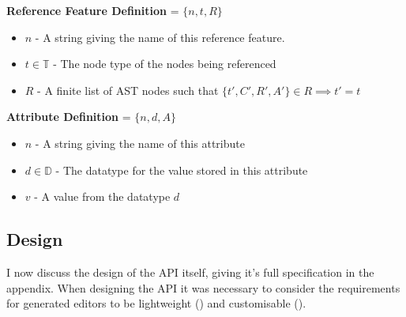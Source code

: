 \documentclass{article}
\begin{document}
%
\textbf{Reference Feature Definition} = $\{n,t,R\}$ 
\begin{itemize}
\item $n$ - A string giving the name of this reference feature.
\item $t\in \mathbb{T}$ - The node type of the nodes being referenced 
\item $R$ - A finite list of AST nodes such that $\{t',C',R',A'\} \in R \implies t'=t$
\end{itemize}
%
\textbf{Attribute Definition} = $\{n,d,A\}$ 
\begin{itemize}
\item $n$ - A string giving the name of this attribute
\item $d\in \mathbb{D}$ - The datatype for the value stored in this attribute
\item $v$ - A value from the datatype $d$
\end{itemize}
%
\subsection{Design}\label{apiDesign}
I now discuss the design of the API itself, giving it's full specification in the appendix. When designing the API it was necessary to consider the requirements for generated editors to be lightweight (\RLightweight) and customisable (\RCustom).
\end{document}

